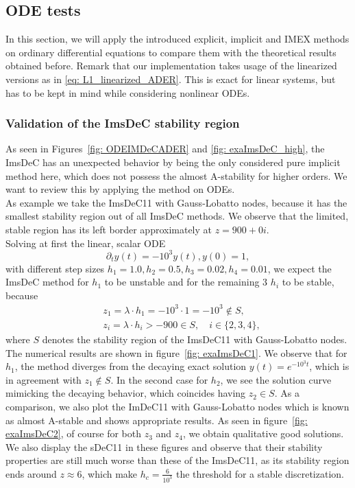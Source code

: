 \subsection{ODE tests}
In this section, we will apply the introduced explicit, implicit and IMEX methods on ordinary differential equations to compare them with the theoretical results obtained before. Remark that our implementation takes usage of the linearized versions as in \eqref{eq: L1_linearized_ADER}. This is exact for linear systems, but has to be kept in mind while considering nonlinear ODEs. 
\subsubsection{Validation of the ImsDeC stability region}
As seen in Figures~\ref{fig: ODEIMDeCADER} and \ref{fig: exaImsDeC_high}, the ImsDeC has an unexpected behavior by being the only considered pure implicit method here, which does not possess the almost A-stability for higher orders. We want to review this by applying the method on ODEs. \\
As example we take the ImsDeC11 with Gauss-Lobatto nodes, because it has the smallest stability region out of all ImsDeC methods. We observe that the limited, stable region has its left border approximately at $z=900+0i$. \\
Solving at first the linear, scalar ODE
\begin{equation}\label{eq: ImsDeC_linear_scalar}
\partial_t y(t) =-10^3y(t), y(0)=1,
\end{equation}
with different step sizes $h_1=1.0, h_2=0.5, h_3=0.02, h_4=0.01$, we expect the ImsDeC method for $h_1$ to be unstable and for the remaining 3 $h_i$ to be stable, because 
\begin{align*}
&z_1=\lambda\cdot h_1=-10^3\cdot 1=-10^3 \notin S,\\
&z_i=\lambda\cdot h_i>-900 \in S,\quad i\in\{2,3,4\},
\end{align*}
where $S$ denotes the stability region of the ImsDeC11 with Gauss-Lobatto nodes. The numerical results are shown in figure~\ref{fig: exaImsDeC1}. We observe that for $h_1$, the method diverges from the decaying exact solution $y(t)=e^{-10^3t}$, which is in agreement with $z_1 \notin S$. In the second case for $h_2$, we see the solution curve mimicking the decaying behavior, which coincides having $z_2\in S$. As a comparison, we also plot the ImDeC11 with Gauss-Lobatto nodes which is known as almost A-stable and shows appropriate results. As seen in figure~\ref{fig: exaImsDeC2}, of course for both $z_3$ and $z_4$, we obtain qualitative good solutions. 
We also display the sDeC11 in these figures and observe that their stability properties are still much worse than these of the ImsDeC11, as its stability region ends around $z\approx 6$, which make $h_c=\frac{6}{10^3}$ the threshold for a stable discretization.

